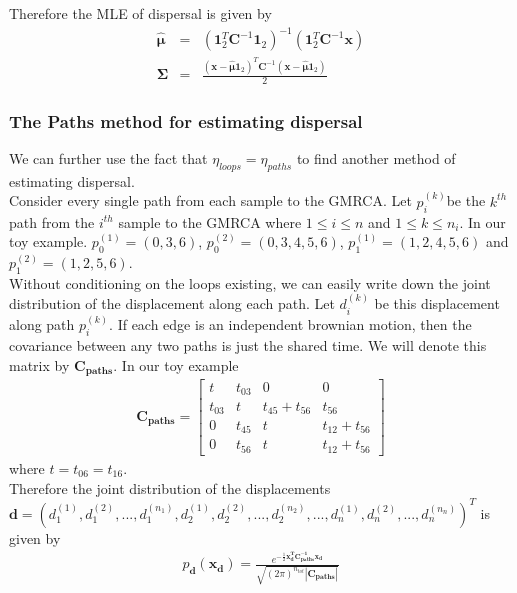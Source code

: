 Therefore the MLE of dispersal is given by 
\begin{eqnarray*}
    \boldsymbol{\hat{\mu}} &=& (\mathbf{1}_2^T\mathbf{C}^{-1}\mathbf{1}_2)^{-1} ( \mathbf{1}_2^T\mathbf{C}^{-1}\mathbf{x} ) \\
\boldsymbol{\Sigma} &=& \frac{(\mathbf{x} - \boldsymbol{\hat{\mu}}\mathbf{1}_2 )^T \mathbf{C}^{-1} (\mathbf{x} - \boldsymbol{\hat{\mu}}\mathbf{1}_2 )}{2}
\end{eqnarray*}

\subsubsection{The Paths method for estimating dispersal}
We can further use the fact that $\eta_{loops} = \eta_{paths}$ to find another method of estimating dispersal. \\
Consider every single path from each sample to the GMRCA. Let $ p_{i}^{(k)} $be the $k^{th}$ path from the $i^{th}$ sample to the GMRCA where $1 \leq i \leq n$ and $1 \leq k \leq n_i$. In our toy example. $p_0^{(1)} = (0,3,6)$, $p_0^{(2)} = (0,3,4,5,6)$, $p_1^{(1)} = (1,2,4,5,6)$ and $p_1^{(2)} = (1,2,5,6)$. \\
Without conditioning on the loops existing, we can easily write down the joint distribution of the displacement along each path. Let $d_i^{(k)}$ be this displacement along path $p_i^{(k)}$. If each edge is an independent brownian motion, then the covariance between any two paths is just the shared time. We will denote this matrix by $\mathbf{C_{paths}}$. In our toy example 
\begin{eqnarray*}
    \mathbf{C_{paths}} = \begin{bmatrix}
        t & t_{03} & 0 & 0 \\
        t_{03} & t & t_{45} + t_{56} & t_{56} \\
        0 & t_{45} & t & t_{12} + t_{56} \\
        0 & t_{56} & t & t_{12} + t_{56} 
    \end{bmatrix}
\end{eqnarray*}
where $t = t_{06} = t_{16}$. \\
Therefore the joint distribution of the displacements $ \mathbf{d} = ( d_1^{(1)}, d_1^{(2)}, ..., d_1^{(n_1)},d_2^{(1)}, d_2^{(2)}, ..., d_2^{(n_2)},...,d_n^{(1)}, d_n^{(2)}, ..., d_n^{(n_n)}   )^T   $ is given by 
\begin{eqnarray*}
\displaystyle 
 p_{ \mathbf{d} }(\mathbf{x_d}) = \frac{e^{ -\frac{1}{2} \mathbf{x_d^TC_{paths}^{-1}x_d} }}{\sqrt{(2\pi)^{n_{tot}} |\mathbf{C_{paths}}| }}     
\end{eqnarray*}
